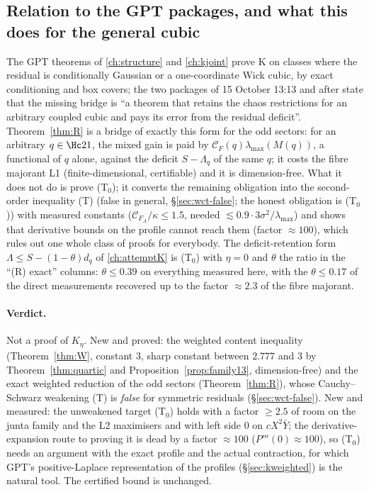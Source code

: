 \subsection{Relation to the GPT packages, and what this does for the general cubic}
The GPT theorems of \autoref{ch:structure} and \autoref{ch:kjoint} prove K on classes where the residual is conditionally Gaussian or a one-coordinate Wick cubic, by exact conditioning and box
covers; the two packages of 15 October 13:13 and after state that the missing bridge is ``a theorem that retains the chaos restrictions for an arbitrary coupled cubic and pays its error from the
residual deficit''. Theorem~\ref{thm:R} is a bridge of exactly this form for the odd sectors: for an arbitrary $q\in\Hc21$, the mixed gain is paid by $\mathcal C_F(q)\lambda_{\max}(M(q))$, a
functional of $q$ alone, against the deficit $S-\Lambda_q$ of the same $q$; it costs the fibre majorant L1 (finite-dimensional, certifiable) and it is dimension-free. What it does not do is
prove (T$_0$); it converts the remaining obligation into the second-order inequality (T) (false in general, \S\ref{sec:wct-false}; the honest obligation is (T$_0$)) with measured constants ($\mathcal C_{F_A}/\kappa\le1.5$, needed $\lesssim0.9\cdot3\sigma^2/\lambda_{\max}$) and
shows that derivative bounds on the profile cannot reach them (factor $\approx100$), which rules out one whole class of proofs for everybody. The deficit-retention form
$\Lambda\le S-(1-\theta)d_q$ of \autoref{ch:attemptK} is (T$_0$) with $\eta=0$ and $\theta$ the ratio in the ``(R) exact'' columns: $\theta\le0.39$ on everything measured here, with the $\theta\le0.17$ of the direct
measurements recovered up to the factor $\approx2.3$ of the fibre majorant.

\paragraph{Verdict.} Not a proof of $K_\eta$. New and proved: the weighted content inequality (Theorem~\ref{thm:W}, constant $3$, sharp constant between $2.777$ and $3$ by Theorem~\ref{thm:quartic} and Proposition~\ref{prop:family13}, dimension-free) and the exact
weighted reduction of the odd sectors (Theorem~\ref{thm:R}), whose Cauchy--Schwarz weakening (T) is \emph{false} for symmetric residuals (\S\ref{sec:wct-false}). New and measured: the unweakened target (T$_0$) holds with a factor $\ge2.5$ of room on the junta family and the L2 maximisers and with left side $0$ on $cX^2\bar Y$; the derivative-expansion route to
proving it is dead by a factor $\approx100$ ($P'''(0)\approx100$), so (T$_0$) needs an argument with the exact profile and the actual contraction, for which GPT's positive-Laplace representation of the profiles (\S\ref{sec:kweighted}) is the natural tool. The certified bound is unchanged.

